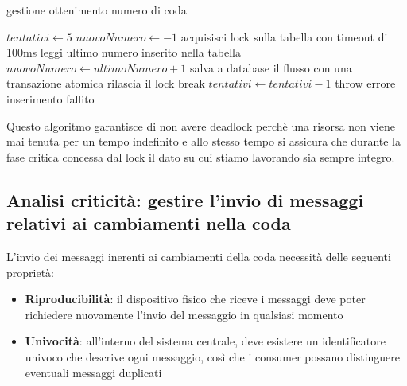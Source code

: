 \documentclass[a4paper, titlepage, 12pt, openright, twoside]{book}
\begin{document}
\begin{algorithm}
\caption{gestione ottenimento numero di coda}
\begin{algorithmic}[1]
\State $tentativi \gets 5$
\State $nuovoNumero \gets -1$
\State acquisisci lock sulla tabella con timeout di 100ms
\State leggi ultimo numero inserito nella tabella
\State $nuovoNumero \gets ultimoNumero + 1$
\State salva a database il flusso con una transazione atomica
\State rilascia il lock
\State break
\Else
\State $tentativi \gets tentativi - 1$
\EndIf
\EndWhile
{}
\State throw errore inserimento fallito
\EndIf
\end{algorithmic}
\end{algorithm}

Questo algoritmo garantisce di non avere deadlock perchè una risorsa non viene mai tenuta per un tempo indefinito e allo stesso tempo si assicura che durante la fase critica concessa dal lock il dato su cui stiamo lavorando sia sempre integro.

\subsection{Analisi criticità: gestire l'invio di messaggi relativi ai cambiamenti nella coda}

L'invio dei messaggi inerenti ai cambiamenti della coda necessità delle seguenti proprietà:

\begin{itemize}
	\item \textbf{Riproducibilità}: il dispositivo fisico che riceve i messaggi deve poter richiedere nuovamente l'invio del messaggio in qualsiasi momento
	\item \textbf{Univocità}: all'interno del sistema centrale, deve esistere un identificatore univoco che descrive ogni messaggio, così che i consumer possano distinguere eventuali messaggi duplicati
\end{itemize}
\end{document}
